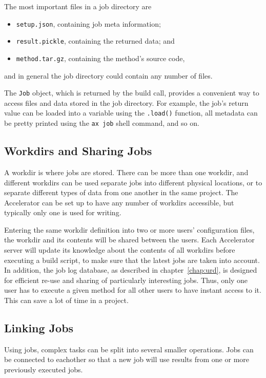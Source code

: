 The most important files in a job directory are
\begin{itemize}
\item[] \texttt{setup.json}, containing job meta information;
\item[] \texttt{result.pickle}, containing the returned data; and
\item[] \texttt{method.tar.gz}, containing the method's source code,
\end{itemize}
and in general the job directory could contain any number of files.

The \texttt{Job} object, which is returned by the build call, provides
a convenient way to access files and data stored in the job directory.
For example, the job's return value can be loaded into a variable
using the \texttt{.load()} function, all metadata can be pretty
printed using the \texttt{ax job} shell command, and so on.



\subsection{Workdirs and Sharing Jobs}

A workdir is where jobs are stored.  There can be more than one
workdir, and different workdirs can be used separate jobs into
different physical locations, or to separate different types of data
from one another in the same project.  The Accelerator can be set up
to have any number of workdirs accessible, but typically only one is
used for writing.

Entering the same workdir definition into two or more users'
configuration files, the workdir and its contents will be shared
between the users.  Each Accelerator server will update its knowledge
about the contents of all workdirs before executing a build script, to
make sure that the latest jobs are taken into account.  In addition,
the job log database, as described in chapter~\ref{chap:urd}, is
designed for efficient re-use and sharing of particularly interesting
jobs.  Thus, only one user has to execute a given method for all other
users to have instant access to it.  This can save a lot of time in a
project.


\subsection{Linking Jobs}

Using jobs, complex tasks can be split into several smaller
operations.  Jobs can be connected to eachother so that a new job will
use results from one or more previously executed jobs.

